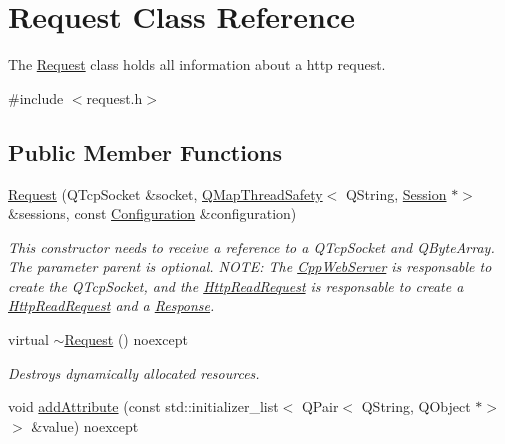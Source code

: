 \hypertarget{class_request}{}\section{Request Class Reference}
\label{class_request}


The \hyperlink{class_request}{Request} class holds all information about a http request.  




{\ttfamily \#include $<$request.\+h$>$}

\subsection*{Public Member Functions}
\begin{DoxyCompactItemize}
\item 
\mbox{\label{class_request_a5dbe3045d76139502b0c0db5c67ea900}} 
\hyperlink{class_request_a5dbe3045d76139502b0c0db5c67ea900}{Request} (Q\+Tcp\+Socket \&socket, \hyperlink{class_q_map_thread_safety}{Q\+Map\+Thread\+Safety}$<$ Q\+String, \hyperlink{class_session}{Session} $\ast$$>$ \&sessions, const \hyperlink{class_configuration}{Configuration} \&configuration)
\begin{DoxyCompactList}\small\item\em This constructor needs to receive a reference to a Q\+Tcp\+Socket and Q\+Byte\+Array. The parameter parent is optional. N\+O\+TE\+: The \hyperlink{class_cpp_web_server}{Cpp\+Web\+Server} is responsable to create the Q\+Tcp\+Socket, and the \hyperlink{class_http_read_request}{Http\+Read\+Request} is responsable to create a \hyperlink{class_http_read_request}{Http\+Read\+Request} and a \hyperlink{class_response}{Response}. \end{DoxyCompactList}\item 
\mbox{\label{class_request_ac6936b15e3d926bc4cc208357c4100df}} 
virtual \hyperlink{class_request_ac6936b15e3d926bc4cc208357c4100df}{$\sim$\+Request} () noexcept
\begin{DoxyCompactList}\small\item\em Destroys dynamically allocated resources. \end{DoxyCompactList}\item 
\mbox{\label{class_request_ad856d106a54dffed5e478858cdaa7618}} 
void \hyperlink{class_request_ad856d106a54dffed5e478858cdaa7618}{add\+Attribute} (const std\+::initializer\+\_\+list$<$ Q\+Pair$<$ Q\+String, Q\+Object $\ast$$>$$>$ \&value) noexcept
$$
\end{DoxyCompactItemize}
